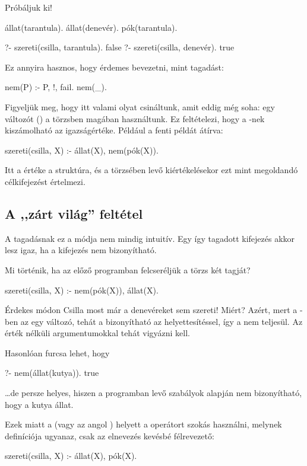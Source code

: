 Próbáljuk ki!
\begin{program}
állat(tarantula).
állat(denevér).
pók(tarantula).
\end{program}
\begin{query}
?- szereti(csilla, tarantula).
false
?- szereti(csilla, denevér).
true
\end{query}
Ez annyira hasznos, hogy érdemes bevezetni, mint
tagadást:
\begin{program}
nem(P) :- P, !, fail.
nem(_).
\end{program}

Figyeljük meg, hogy itt valami olyat csináltunk,
amit eddig még soha: egy változót () a
törzsben magában használtunk. Ez feltételezi, hogy a
-nek kiszámolható az igazságértéke. Például a
fenti példát átírva:
\begin{program}
szereti(csilla, X) :- állat(X), nem(pók(X)).
\end{program}
Itt a  értéke a  struktúra, és a
 törzsében levő  kiértékelésekor ezt
mint megoldandó célkifejezést értelmezi.

\subsection*{A ,,zárt világ'' feltétel}
A tagadásnak ez a módja nem mindig intuitív. Egy így
tagadott kifejezés akkor lesz igaz, ha a kifejezés
nem bizonyítható.

Mi történik, ha az előző programban felcseréljük a
törzs két tagját?
\begin{program}
szereti(csilla, X) :- nem(pók(X)), állat(X).
\end{program}
Érdekes módon Csilla most már a denevéreket sem
szereti! Miért? Azért, mert a -ben
az  egy változó, tehát a 
bizonyítható az  helyettesítéssel,
így a  nem teljesül. Az érték
nélküli argumentumokkal tehát vigyázni kell.

Hasonlóan furcsa lehet, hogy
\begin{query}
?- nem(állat(kutya)).
true
\end{query}
\dots de persze helyes, hiszen a programban levő
szabályok alapján nem bizonyítható, hogy a kutya
állat.

Ezek miatt a  (vagy az angol )
helyett a \pr{\textbackslash+} operátort szokás
használni, melynek definíciója ugyanaz, csak az
elnevezés kevésbé félrevezető:
\begin{program}
szereti(csilla, X) :- állat(X), \+ pók(X).
\end{program}
\index{\pr{\textbackslash+}}

